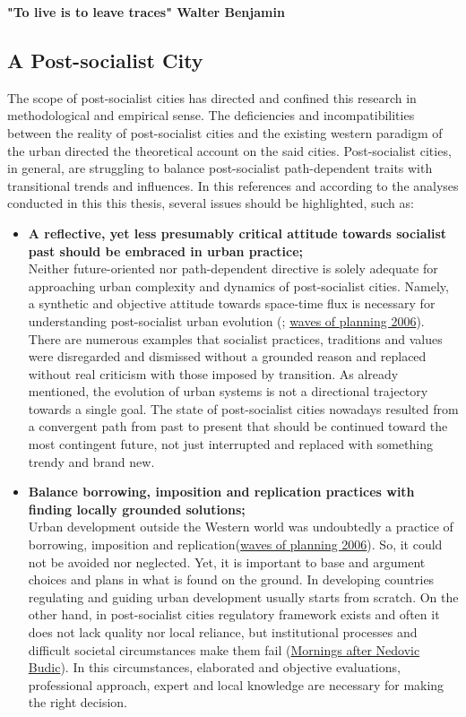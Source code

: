 \documentclass[11pt]{report}
\begin{document}
{\begin{itemize}
\end{itemize}

\textbf{"To live is to leave traces" Walter Benjamin}

\subsection{A Post-socialist City}

The scope of post-socialist cities has directed and confined this research in methodological and empirical sense.
The deficiencies and incompatibilities between the reality of post-socialist cities and the existing western paradigm of the urban directed the theoretical account on the said cities.
Post-socialist cities, in general, are struggling to balance post-socialist path-dependent traits with transitional trends and influences.
In this references and according to the analyses conducted in this this thesis, several issues should be highlighted, such as:

\begin{itemize}
\item \textbf{A reflective, yet less presumably critical attitude towards socialist past should be embraced in urban practice;}
\\
Neither future-oriented nor path-dependent directive is solely adequate for approaching urban complexity and dynamics of  post-socialist cities. Namely, a synthetic and objective attitude towards space-time flux is necessary for understanding post-socialist urban evolution (\cite{Thomas 1998}; \href{}{waves of planning 2006}).
There are numerous examples that socialist practices, traditions and values were disregarded and dismissed without a grounded reason and replaced without real criticism with those imposed by transition.
As already mentioned, the evolution of urban systems is not a directional trajectory towards a single goal.
The state of post-socialist cities nowadays resulted from a convergent path from past to present that should be continued toward the most contingent future, not just interrupted and replaced with something trendy and brand  new.

\item \textbf{Balance borrowing, imposition and replication practices with finding locally grounded solutions;}
\\
Urban development outside the Western world was undoubtedly a practice of borrowing, imposition and replication(\href{}{waves of planning 2006}). So, it could not be avoided nor neglected.
Yet, it is important to base and argument choices and plans in what is found on the ground.
In developing countries regulating and guiding urban development usually starts from scratch.
On the other hand,  in post-socialist cities regulatory framework exists and often it does not lack quality nor local reliance, but institutional processes and difficult societal circumstances make them fail (\href{}{Mornings after Nedovic Budic}). In this circumstances, elaborated and objective evaluations, professional approach, expert and local knowledge are necessary for making the right decision.


\end{itemize}}
\end{document}
